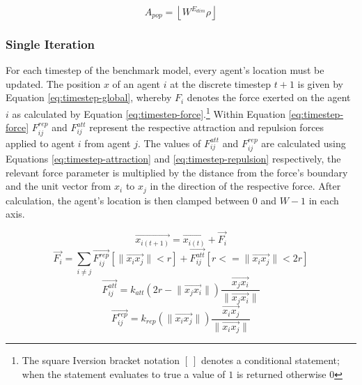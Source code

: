       \begin{equation}\label{eq:agent_population_size}
        A_{pop} = \left\lfloor{W^{E_{dim}} \rho}\right\rfloor
      \end{equation}
      
    \subsubsection{Single Iteration}
      For each timestep of the benchmark model, every agent's location must be updated. The position $x$ of an agent $i$ at the discrete timestep $t+1$ is given by Equation \ref{eq:timestep-global}, whereby $F_{i}$ denotes the force exerted on the agent $i$ as calculated by Equation \ref{eq:timestep-force}.\footnote{The square Iversion bracket notation $[\:]$ denotes a conditional statement; when the statement evaluates to true a value of $1$ is returned otherwise $0$} Within Equation \ref{eq:timestep-force} $F_{ij}^{rep}$ and $F_{ij}^{att}$ represent the respective attraction and repulsion forces applied to agent $i$ from agent $j$. The values of $F_{ij}^{att}$ and $F_{ij}^{rep}$ are calculated using Equations \ref{eq:timestep-attraction} and \ref{eq:timestep-repulsion} respectively, the relevant force parameter is multiplied by the distance from the force's boundary and the unit vector from $x_{i}$ to $x_{j}$ in the direction of the respective force. After calculation, the agent's location is then clamped between $0$ and $W-1$ in each axis.
      
      \begin{equation}\label{eq:timestep-global}
        \overrightarrow{x_{i(t+1)}} = \overrightarrow{x_{i(t)}} + \overrightarrow{F_{i}}
      \end{equation}
      \begin{equation}\label{eq:timestep-force}
        \overrightarrow{F_{i}} = \sum\limits_{i \neq j} \overrightarrow{F_{ij}^{rep}}[\lVert\overrightarrow{x_{i}x_{j}}\rVert < r] + \overrightarrow{F_{ij}^{att}}[r <= \lVert\overrightarrow{x_{i}x_{j}}\rVert < 2r]
      \end{equation}
      \begin{equation}\label{eq:timestep-attraction}
        \overrightarrow{F_{ij}^{att}} = k_{att}(2r-\lVert\overrightarrow{x_{j}x_{i}}\rVert)\frac{\overrightarrow{x_{j}x_{i}}}{\lVert\overrightarrow{x_{j}x_{i}}\rVert}
      \end{equation} 
      \begin{equation}\label{eq:timestep-repulsion}
        \overrightarrow{F_{ij}^{rep}} = k_{rep}(\lVert\overrightarrow{x_{i}x_{j}}\rVert)\frac{\overrightarrow{x_{i}x_{j}}}{\lVert\overrightarrow{x_{i}x_{j}}\rVert}
      \end{equation}
      
